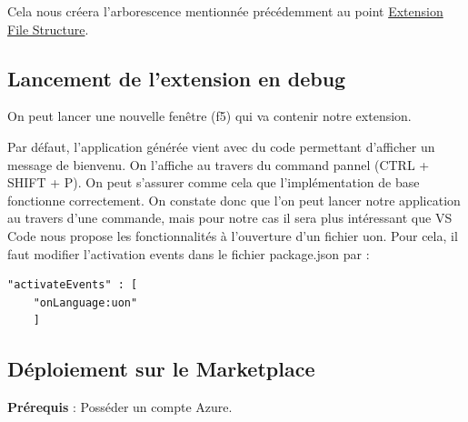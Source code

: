 \documentclass[
    iict, %
    il, %
]{heig-tb}
\begin{document}
Cela nous créera l'arborescence mentionnée précédemment au point \hyperref[Extension File Structure]{Extension File Structure}.

\subsection{Lancement de l'extension en debug}
On peut lancer une nouvelle fenêtre (f5) qui va contenir notre extension.

Par défaut, l'application générée vient avec du code permettant d'afficher un message de bienvenu. On l'affiche au travers du command pannel (CTRL + SHIFT + P). On peut s'assurer comme cela que l'implémentation de base fonctionne correctement.
On constate donc que l'on peut lancer notre application au travers d'une commande, mais pour notre cas il sera plus intéressant que VS Code nous propose les fonctionnalités à l'ouverture d'un fichier uon.
Pour cela, il faut modifier l'activation events dans le fichier package.json par :
\begin{lstlisting}[frame=single]
    "activateEvents" : [
	"onLanguage:uon"
    ]
\end{lstlisting}

\subsection{Déploiement sur le Marketplace}


\textbf{Prérequis} : Posséder un compte Azure.

\end{document}
